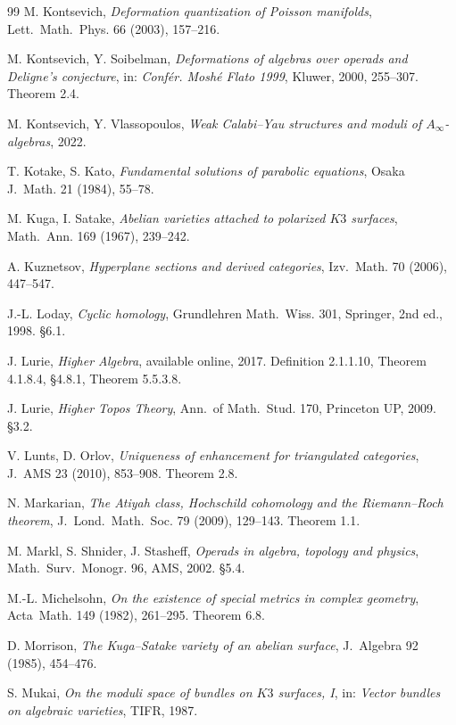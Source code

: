 \documentclass[11pt,reqno]{amsart}
\theoremstyle{plain}
\theoremstyle{definition}
\theoremstyle{remark}
\begin{document}
\begin{thebibliography}{99}
 M. Kontsevich, \emph{Deformation quantization of Poisson manifolds}, Lett.~Math.~Phys. 66 (2003), 157--216.

 M. Kontsevich, Y. Soibelman, \emph{Deformations of algebras over operads and Deligne's conjecture}, in: \emph{Confér. Moshé Flato 1999}, Kluwer, 2000, 255--307. Theorem 2.4.

 M. Kontsevich, Y. Vlassopoulos, \emph{Weak Calabi--Yau structures and moduli of $A_\infty$-algebras}, 2022.

 T. Kotake, S. Kato, \emph{Fundamental solutions of parabolic equations}, Osaka J.~Math. 21 (1984), 55--78.

 M. Kuga, I. Satake, \emph{Abelian varieties attached to polarized $K3$ surfaces}, Math.~Ann. 169 (1967), 239--242.

 A. Kuznetsov, \emph{Hyperplane sections and derived categories}, Izv.~Math. 70 (2006), 447--547.

 J.-L. Loday, \emph{Cyclic homology}, Grundlehren Math.~Wiss. 301, Springer, 2nd ed., 1998. \S6.1.

 J. Lurie, \emph{Higher Algebra}, available online, 2017. Definition 2.1.1.10, Theorem 4.1.8.4, \S4.8.1, Theorem 5.5.3.8.

 J. Lurie, \emph{Higher Topos Theory}, Ann.~of Math.~Stud. 170, Princeton UP, 2009. \S3.2.

 V. Lunts, D. Orlov, \emph{Uniqueness of enhancement for triangulated categories}, J.~AMS 23 (2010), 853--908. Theorem 2.8.

 N. Markarian, \emph{The Atiyah class, Hochschild cohomology and the Riemann--Roch theorem}, J.~Lond.~Math.~Soc. 79 (2009), 129--143. Theorem 1.1.

 M. Markl, S. Shnider, J. Stasheff, \emph{Operads in algebra, topology and physics}, Math.~Surv.~Monogr. 96, AMS, 2002. \S5.4.

 M.-L. Michelsohn, \emph{On the existence of special metrics in complex geometry}, Acta~Math. 149 (1982), 261--295. Theorem 6.8.

 D. Morrison, \emph{The Kuga--Satake variety of an abelian surface}, J.~Algebra 92 (1985), 454--476.

 S. Mukai, \emph{On the moduli space of bundles on $K3$ surfaces, I}, in: \emph{Vector bundles on algebraic varieties}, TIFR, 1987.


\end{thebibliography}
\end{document}
